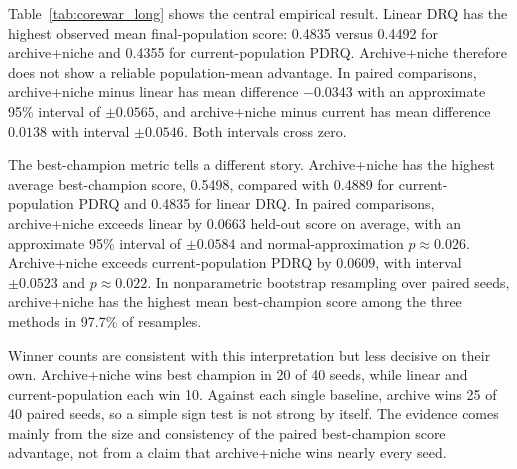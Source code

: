 \documentclass[11pt]{article}
\begin{document}
\begin{table}[t]
\centering
\caption{Core War long-profile results across 40 paired seeds. Values are means $\pm$ approximate 95\% confidence intervals over seeds. ``Mean wins'' counts the number of seeds where a method had the highest mean final-population score. ``Best wins'' counts the number of seeds where a method had the highest best-champion score.}
\label{tab:corewar_long}

\end{table}

\begin{table}[t]
\centering
\caption{External benchmark check for the eight highest-scoring generated champions by internal held-out score. Scores are mean normalized pMARS margins under the paper's fixed settings; negative values mean the generated warrior loses on average to the benchmark suite. K-Top50 denotes the downloaded Koenigstuhl 94nop Top-50 archive, Rand50 is a deterministic valid sample from the full 94nop archive, and CGM1 is the Corewar Global Masters round 1 benchmark.}
\label{tab:corewar_benchmarks}
\resizebox{\linewidth}{!}{}
\end{table}

Table~\ref{tab:corewar_long} shows the central empirical result. Linear DRQ has the highest observed mean final-population score: 0.4835 versus 0.4492 for archive+niche and 0.4355 for current-population PDRQ. Archive+niche therefore does not show a reliable population-mean advantage. In paired comparisons, archive+niche minus linear has mean difference $-0.0343$ with an approximate 95\% interval of $\pm 0.0565$, and archive+niche minus current has mean difference $0.0138$ with interval $\pm 0.0546$. Both intervals cross zero.

The best-champion metric tells a different story. Archive+niche has the highest average best-champion score, 0.5498, compared with 0.4889 for current-population PDRQ and 0.4835 for linear DRQ. In paired comparisons, archive+niche exceeds linear by $0.0663$ held-out score on average, with an approximate 95\% interval of $\pm 0.0584$ and normal-approximation $p\approx0.026$. Archive+niche exceeds current-population PDRQ by $0.0609$, with interval $\pm 0.0523$ and $p\approx0.022$. In nonparametric bootstrap resampling over paired seeds, archive+niche has the highest mean best-champion score among the three methods in 97.7\% of resamples.

Winner counts are consistent with this interpretation but less decisive on their own. Archive+niche wins best champion in 20 of 40 seeds, while linear and current-population each win 10. Against each single baseline, archive wins 25 of 40 paired seeds, so a simple sign test is not strong by itself. The evidence comes mainly from the size and consistency of the paired best-champion score advantage, not from a claim that archive+niche wins nearly every seed.
\end{document}
